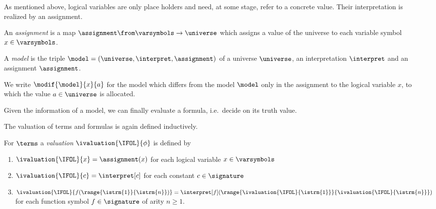             As mentioned above, logical variables are only place holders and need, at some stage, refer to a concrete value. Their interpretation is realized by an assignment.

            \begin{definition}[Assignment]
                An \emph{assignment} is a map $\assignment\from\varsymbols\to\universe$ which assigns a value of the universe to each variable symbol $x\in\varsymbols$.
            \end{definition}

            \begin{definition}[Model]
                A \emph{model} is the triple $\model=(\universe,\interpret,\assignment)$ of a universe $\universe$, an interpretation $\interpret$ and an assignment $\assignment$.
            \end{definition}

            We write $\modif{\model}{x}{a}$ for the model which differs from the model $\model$ only in the assignment to the logical variable $x$, to which the value $a\in\universe$ is allocated.

            Given the information of a model, we can finally evaluate a formula, i.e.\ decide on its truth value.

            The valuation of terms and formulas is again defined inductively.
            \begin{definition}
                For $\terms$ a \emph{valuation} $\ivaluation{\IFOL}{\phi}$ is defined by
                \begin{enumerate}
                    \item $\ivaluation{\IFOL}{x} = \assignment(x)$ for each logical variable $x\in\varsymbols$
                    \item $\ivaluation{\IFOL}{c} = \interpret[c]$ for each constant $c\in\signature$
                    \item $\ivaluation{\IFOL}{f(\range{\istrm{1}}{\istrm{n}})} = \interpret[f](\range{\ivaluation{\IFOL}{\istrm{1}}}{\ivaluation{\IFOL}{\istrm{n}}})$ for each function symbol $f\in\signature$ of arity $n\geq 1$.
                \end{enumerate}
            \end{definition}

